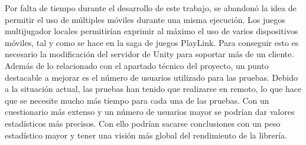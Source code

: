 Por falta de tiempo durante el desarrollo de este trabajo, se abandon\'o la idea de permitir el uso de m\'ultiples m\'oviles durante una misma ejecuci\'on. Los juegos multijugador locales permitir\'ian exprimir al m\'aximo el uso de varios dispositivos m\'oviles, tal y como se hace en la saga de juegos PlayLink. Para conseguir esto es necesario la modificaci\'on del servidor de Unity para soportar m\'as de un cliente. \\

Adem\'as de lo relacionado con el apartado t\'ecnico del proyecto, un punto destacable a mejorar es el n\'umero de usuarios utilizado para las pruebas. Debido a la situaci\'on actual, las pruebas han tenido que realizarse en remoto, lo que hace que se necesite mucho m\'as tiempo para cada una de las pruebas. Con un cuestionario m\'as extenso y un n\'umero de usuarios mayor se podr\'ian dar valores estad\'isticos m\'as precisos. Con ello podr\'ian sacarse conclusiones con un peso estad\'istico mayor y tener una visi\'on m\'as global del rendimiento de la librer\'ia.